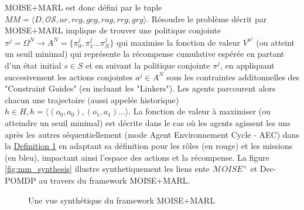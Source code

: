 \documentclass[sigconf,anonymous]{aamas}
\begin{document}
MOISE+MARL est donc défini par le tuple $MM = \langle D, \mathcal{OS}, ar, rcg, \allowbreak gcg, rag, rrg, grg\rangle$.
Résoudre le problème décrit par MOISE+MARL implique de trouver une politique conjointe $\pi^{j} = \Omega^{N} \to A^{N} = \{\pi^j_0,\pi^j_1\dots\pi^j_N\}$ qui maximise la fonction de valeur $V^{\pi^{j}}$ (ou atteint un seuil minimal) qui représente la récompense cumulative espérée en partant d'un état initial $s \in S$ et en suivant la politique conjointe $\pi^{j}$, en appliquant succesivement les actions conjointes $a^{j} \in A^N$ sous les contraintes additonnelles des "Constraint Guides" (en incluant les "Linkers"). Les agents parcourent alors chacun une trajectoire (aussi appelée historique) $h \in H, h = \langle(o_0,a_0), (o_1,a_1)\dots\rangle$. La fonction de valeur à maximiser (ou atteindre un seuil minimal) est décrite dans le cas où les agents agissent les uns après les autres séquentiellement (mode Agent Environnement Cycle - AEC) dans la \hyperref[eq:single_value_function]{Definition 1} en adaptant sa définition pour les rôles (en rouge) et les missions (en bleu), impactant ainsi l'espace des actions et la récompense. La figure \autoref{fig:mm_synthesis} illustre synthetiquement les liens ente $\mathcal{M}OISE^+$ et Dec-POMDP au travers du framework MOISE+MARL.

\begin{figure*}[h!]
  \centering
  
  \caption{Une vue synthétique du framework MOISE+MARL}
  \label{fig:mm_synthesis}
\end{figure*}

\end{document}
